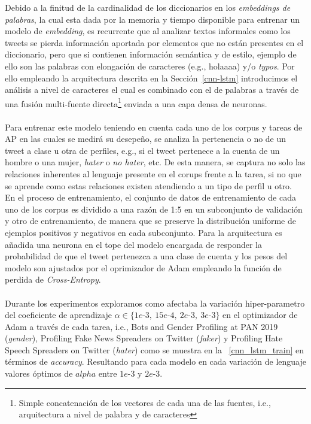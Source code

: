  	Debido a la finitud de la cardinalidad de los diccionarios en los \textit{embeddings de palabras}, la cual esta dada por la memoria y tiempo disponible para entrenar un modelo de \textit{embedding}, es recurrente que al analizar textos informales como los tweets se pierda información aportada por elementos que no están presentes en el diccionario, pero que si contienen información semántica y de estilo, ejemplo de ello son las palabras con elongación de caracteres (e.g., holaaaa) y/o \textit{typos}. Por ello empleando la arquitectura descrita en la Sección~\ref{cnn-lstm} introducimos el análisis a nivel de caracteres el cual es combinado con el de palabras a través de una fusión multi-fuente directa\footnote{Simple concatenación de los vectores de cada una de las fuentes, i.e., arquitectura a nivel de palabra y de caracteres} enviada a una capa densa de neuronas.
 	\\\\
 	Para entrenar este modelo teniendo en cuenta cada uno de los corpus y tareas de AP en las cuales se medirá su desepeño, se analiza la pertenencia o no de un tweet a clase u otra de perfiles, e.g., si el tweet pertenece a la cuenta de un hombre o una mujer, \textit{hater }o \textit{no hater}, etc. De esta manera, se captura no solo las relaciones inherentes al lenguaje presente en el corups frente a la tarea, si no que se aprende como estas relaciones existen atendiendo a un tipo de perfil u otro.
 	\\
 	En el proceso de entrenamiento, el conjunto de datos de entrenamiento de cada uno de los corpus es dividido a una razón de 1:5 en un subconjunto de validación y otro de entrenamiento, de manera que se preserve la distribución uniforme de ejemplos positivos y negativos en cada subconjunto.
 	Para la arquitectura es añadida una neurona en el tope del modelo encargada de responder la probabilidad de que el tweet pertenezca a una clase de cuenta y los pesos del modelo son ajustados por el oprimizador de Adam \citep{DBLP:journals/corr/KingmaB14} empleando la función de perdida de \textit{Cross-Entropy}.  	\\\\
 	Durante los experimentos exploramos como afectaba la variación hiper-parametro del coeficiente de aprendizaje $\alpha \in \{1e\text{-}3,~15e\text{-}4,~2e\text{-}3,~3e\text{-}3\}$  en el optimizador de Adam a través de cada tarea, i.e., Bots and Gender Profiling at PAN 2019 (\textit{gender}), Profiling Fake News Spreaders on Twitter (\textit{faker}) y Profiling Hate Speech Spreaders on Twitter (\textit{hater}) como se muestra en la \tablename~\ref{cnn_lstm_train} en términos de \textit{accuracy}. Resultando para cada modelo en cada variación de lenguaje valores óptimos de  $alpha$ entre $1e\text{-}3\text{ y }2e\text{-}3$.
